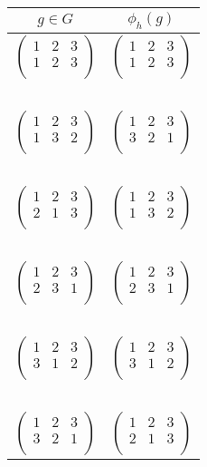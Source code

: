 \begin{table}[h]
\centering
\begin{tabular}{c|c}
$g \in G$ & $\phi_h(g)$\\
\hline
$\begin{pmatrix}1 & 2 & 3\\1 & 2 & 3\\\end{pmatrix}$ & $\begin{pmatrix}1 & 2 & 3\\1 & 2 & 3\\\end{pmatrix}$\\~\\
$\begin{pmatrix}1 & 2 & 3\\1 & 3 & 2\\\end{pmatrix}$ & $\begin{pmatrix}1 & 2 & 3\\3 & 2 & 1\\\end{pmatrix}$\\~\\
$\begin{pmatrix}1 & 2 & 3\\2 & 1 & 3\\\end{pmatrix}$ & $\begin{pmatrix}1 & 2 & 3\\1 & 3 & 2\\\end{pmatrix}$\\~\\
$\begin{pmatrix}1 & 2 & 3\\2 & 3 & 1\\\end{pmatrix}$ & $\begin{pmatrix}1 & 2 & 3\\2 & 3 & 1\\\end{pmatrix}$\\~\\
$\begin{pmatrix}1 & 2 & 3\\3 & 1 & 2\\\end{pmatrix}$ & $\begin{pmatrix}1 & 2 & 3\\3 & 1 & 2\\\end{pmatrix}$\\~\\
$\begin{pmatrix}1 & 2 & 3\\3 & 2 & 1\\\end{pmatrix}$ & $\begin{pmatrix}1 & 2 & 3\\2 & 1 & 3\\\end{pmatrix}$\\
\end{tabular}
\end{table}

